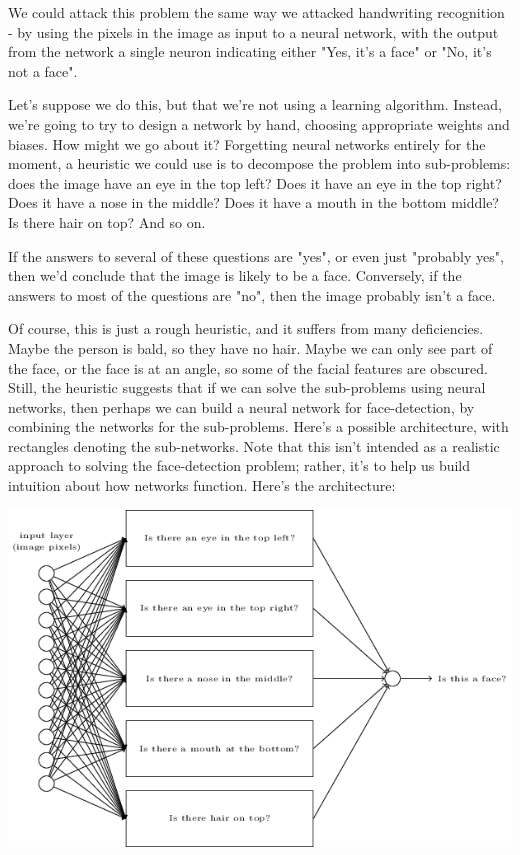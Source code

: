 \documentclass[a4paper,12pt]{report}%
\begin{document}
We could attack this problem the same way we attacked handwriting recognition - by using the pixels in the image as input to a neural network, with the output from the network a single neuron indicating either "Yes, it's a face" or "No, it's not a face".

\smallskip

Let's suppose we do this, but that we're not using a learning algorithm. Instead, we're going to try to design a network by hand, choosing appropriate weights and biases. How might we go about it? Forgetting neural networks entirely for the moment, a heuristic we could use is to decompose the problem into sub-problems: does the image have an eye in the top left? Does it have an eye in the top right? Does it have a nose in the middle? Does it have a mouth in the bottom middle? Is there hair on top? And so on.

\smallskip

If the answers to several of these questions are "yes", or even just "probably yes", then we'd conclude that the image is likely to be a face. Conversely, if the answers to most of the questions are "no", then the image probably isn't a face.

\smallskip

Of course, this is just a rough heuristic, and it suffers from many deficiencies. Maybe the person is bald, so they have no hair. Maybe we can only see part of the face, or the face is at an angle, so some of the facial features are obscured. Still, the heuristic suggests that if we can solve the sub-problems using neural networks, then perhaps we can build a neural network for face-detection, by combining the networks for the sub-problems. Here's a possible architecture, with rectangles denoting the sub-networks. Note that this isn't intended as a realistic approach to solving the face-detection problem; rather, it's to help us build intuition about how networks function. Here's the architecture:

\begin{center}
 \includegraphics[width=0.75\linewidth]{images/tikz14.png}
\end{center}
\end{document}
